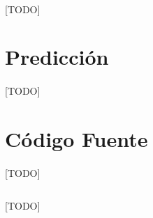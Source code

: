 \documentclass[a4paper, spanish]{article}
\begin{document}
    \paragraph{}
    [TODO]

  \section{Predicción}
  \label{sec:prediction}

    \paragraph{}
    [TODO]

  \appendix
  \section{Código Fuente}
  \label{sec:code}

    \paragraph{}
    [TODO]


    \begin{listing}[H]
        \centering
        \inputminted{R}{./res/code/weight-loss.r}
        \caption{[TODO]}
        \label{}
      \end{listing}
\end{document}
